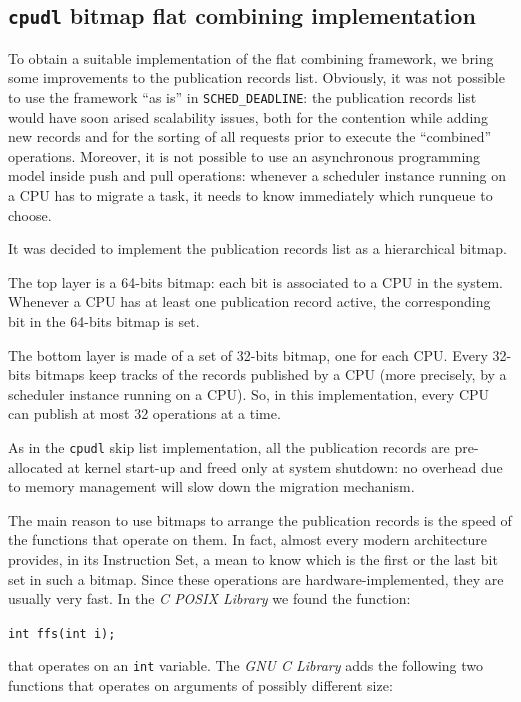 \subsection{\texttt{cpudl} bitmap flat combining implementation\label{sec:cpudl_bm_fc}}

To obtain a suitable implementation of the flat combining framework, we bring some
improvements to the publication records list. Obviously, it was not possible to
use the framework ``as is'' in \texttt{SCHED\_DEADLINE}: the publication records
list would have soon arised scalability issues, both for the contention while adding
new records and for the sorting of all requests prior to execute the ``combined'' 
operations. Moreover, it is not possible to use an asynchronous programming model
inside push and pull operations: whenever a scheduler instance running on a CPU
has to migrate a task, it needs to know immediately which runqueue to choose.

It was decided to implement the publication records list as a hierarchical bitmap.

The top layer is a 64-bits bitmap: each bit is associated to a CPU in the system. 
Whenever a CPU has at least one publication record active, the corresponding
bit in the 64-bits bitmap is set.

The bottom layer is made of a set of 32-bits bitmap, one for each CPU. Every 32-bits
bitmaps keep tracks of the records published by a CPU (more precisely, by a scheduler
instance running on a CPU). So, in this implementation, every CPU can publish at
most 32 operations at a time.

As in the \texttt{cpudl} skip list implementation,
all the publication records are pre-allocated at kernel start-up and freed only 
at system shutdown: no overhead due to memory management will slow down the migration
mechanism.

The main reason to use bitmaps to arrange the publication records is the speed of the
functions that operate on them. In fact, almost every modern architecture provides, in its 
Instruction Set, a mean to know which is the first or the last bit set in such a bitmap.
Since these operations are hardware-implemented, they are usually very fast. In the
\emph{C POSIX Library} we found the function:

\begin{center}
\texttt{int ffs(int i);}
\end{center}

\noindent that operates on an \texttt{int} variable. The \emph{GNU C Library} adds the following
two functions that operates on arguments of possibly different size:

